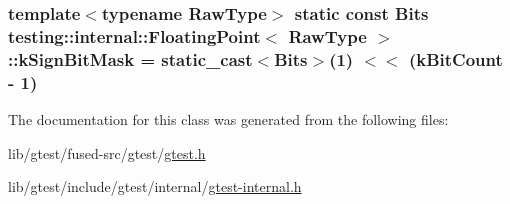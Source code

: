 \hypertarget{classtesting_1_1internal_1_1_floating_point_abf87d32d03b1b7e7237e72e3ab1dd830}{
\subsubsection[{k\-Sign\-Bit\-Mask}]{\setlength{\rightskip}{0pt plus 5cm}template$<$typename Raw\-Type$>$ static const {\bf Bits} {\bf testing\-::internal\-::\-Floating\-Point}$<$ Raw\-Type $>$\-::k\-Sign\-Bit\-Mask = static\-\_\-cast$<${\bf Bits}$>$(1) $<$$<$ ({\bf k\-Bit\-Count} -\/ 1)\hspace{0.3cm}{\ttfamily [static]}}}\label{classtesting_1_1internal_1_1_floating_point_abf87d32d03b1b7e7237e72e3ab1dd830}


The documentation for this class was generated from the following files\-:\begin{DoxyCompactItemize}
\item 
lib/gtest/fused-\/src/gtest/\hyperlink{fused-src_2gtest_2gtest_8h}{gtest.\-h}\item 
lib/gtest/include/gtest/internal/\hyperlink{gtest-internal_8h}{gtest-\/internal.\-h}\end{DoxyCompactItemize}
